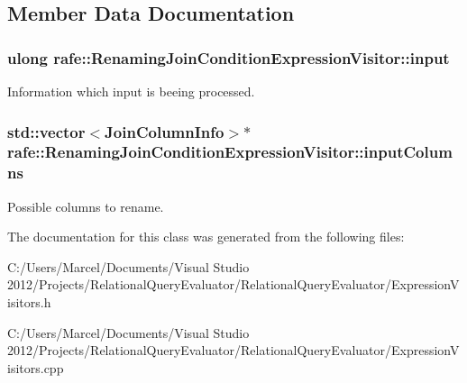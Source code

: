 \subsection{Member Data Documentation}
\hypertarget{classrafe_1_1_renaming_join_condition_expression_visitor_a1802743c1bde8346e752011ccd1810d2}{
\subsubsection[{input}]{\setlength{\rightskip}{0pt plus 5cm}ulong rafe\+::\+Renaming\+Join\+Condition\+Expression\+Visitor\+::input}}\label{classrafe_1_1_renaming_join_condition_expression_visitor_a1802743c1bde8346e752011ccd1810d2}
Information which input is beeing processed. \hypertarget{classrafe_1_1_renaming_join_condition_expression_visitor_a5bda93a30172d4f098a6d4063175d730}{
\subsubsection[{input\+Columns}]{\setlength{\rightskip}{0pt plus 5cm}std\+::vector$<${\bf Join\+Column\+Info}$>$$\ast$ rafe\+::\+Renaming\+Join\+Condition\+Expression\+Visitor\+::input\+Columns}}\label{classrafe_1_1_renaming_join_condition_expression_visitor_a5bda93a30172d4f098a6d4063175d730}
Possible columns to rename. 

The documentation for this class was generated from the following files\+:\begin{DoxyCompactItemize}
\item 
C\+:/\+Users/\+Marcel/\+Documents/\+Visual Studio 2012/\+Projects/\+Relational\+Query\+Evaluator/\+Relational\+Query\+Evaluator/Expression\+Visitors.\+h\item 
C\+:/\+Users/\+Marcel/\+Documents/\+Visual Studio 2012/\+Projects/\+Relational\+Query\+Evaluator/\+Relational\+Query\+Evaluator/Expression\+Visitors.\+cpp\end{DoxyCompactItemize}

